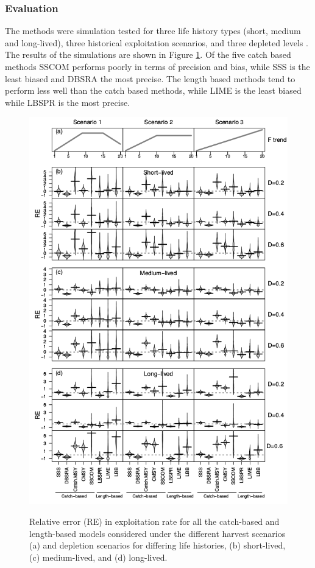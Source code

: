 \subsubsection*{Evaluation}

The methods were simulation tested for three life history types (short, medium and long-lived), three historical exploitation scenarios, and three depleted levels \citep{pons2019catchlen}. The results of the simulations are shown in Figure \ref{fig:cln}. Of the five catch based methods SSCOM performs poorly in terms of precision and bias, while SSS is the least biased and DBSRA the most precise. The length based methods tend to perform less well than the catch based methods, while LIME is the least biased while LBSPR is the most precise.

\begin{figure}[h!]\centering\includegraphics[width=6in]{figs/Figure_1.png}\label{fig:cln}\caption{Relative error (RE) in exploitation rate for all the catch-based and length-based models considered under the different harvest scenarios (a) and depletion scenarios for differing life histories, (b) short-lived, (c) medium-lived, and (d) long-lived.}
\end{figure}

